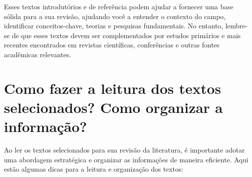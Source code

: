 \documentclass[12pt,a4paper, brazil]{article}
\begin{document}
Esses textos introdutórios e de referência podem ajudar a fornecer uma base sólida para a sua revisão, ajudando você a entender o contexto do campo, identificar conceitos-chave, teorias e pesquisas fundamentais. No entanto, lembre-se de que esses textos devem ser complementados por estudos primários e mais recentes encontrados em revistas científicas, conferências e outras fontes acadêmicas relevantes.

\section{Como fazer a leitura dos textos selecionados? Como organizar a informação?}


Ao ler os textos selecionados para sua revisão da literatura, é importante adotar uma abordagem estratégica e organizar as informações de maneira eficiente. Aqui estão algumas dicas para a leitura e organização dos textos:
\end{document}
